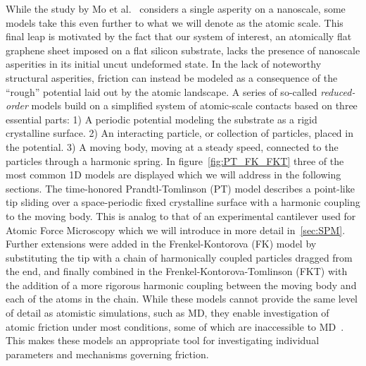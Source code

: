 While the study by Mo et al.~\cite{mo_friction_2009} considers a single
asperity on a nanoscale, some models take this even further to what we will
denote as the atomic scale. This final leap is motivated by the fact that our
system of interest, an atomically flat graphene sheet imposed on a flat silicon
substrate, lacks the presence of nanoscale asperities in its initial uncut
undeformed state. In the lack of noteworthy structural asperities, friction can
instead be modeled as a consequence of the ``rough'' potential laid out by
the atomic landscape. A series of so-called \textit{reduced-order} models build on a
simplified system of atomic-scale contacts based on three essential parts: 1) A
periodic potential modeling the substrate as a rigid crystalline surface. 2) An
interacting particle, or collection of particles, placed in the potential. 3) A
moving body, moving at a steady speed, connected to the particles through a
harmonic spring. In figure~\cref{fig:PT_FK_FKT} three of the most common 1D
models are displayed which we will address in the following sections. The
time-honored Prandtl-Tomlinson (\acrshort{PT}) model describes a point-like tip sliding
over a space-periodic fixed crystalline surface with a harmonic coupling to the
moving body. This is analog to that of an experimental cantilever used for
Atomic Force Microscopy which we will introduce in more detail in~\cref{sec:SPM}. Further extensions were added in the Frenkel-Kontorova
(\acrshort{FK}) model by substituting the tip with a chain of harmonically coupled
particles dragged from the end, and finally combined in the
Frenkel-Kontorova-Tomlinson (\acrshort{FKT}) with the addition of a more
rigorous harmonic coupling between the moving body and each of the atoms in the
chain. While these models cannot provide the same level of detail as atomistic
simulations, such as \acrshort{MD}, they enable investigation of atomic friction
under most conditions, some of which are inaccessible to \acrshort{MD}~\cite{Yalin_2011}. This makes these models an appropriate tool for investigating
individual parameters and mechanisms governing friction.


